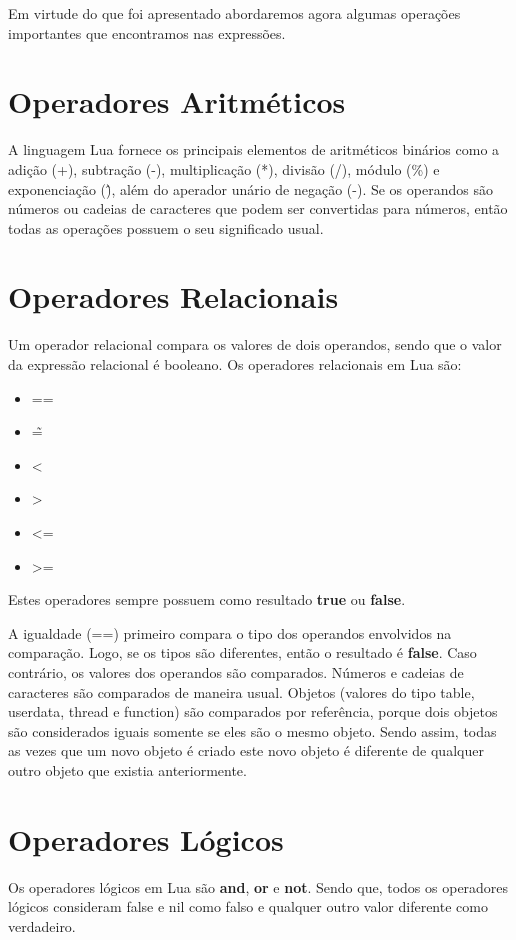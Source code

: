 \documentclass[
12pt, %
openright, %
oneside, %
a4paper, %
english, %
brazil, %
]{abntex2}
\begin{document}
Em virtude do que foi apresentado abordaremos agora algumas operações importantes que encontramos nas expressões.

\section{Operadores Aritméticos}
A linguagem Lua fornece os principais elementos de aritméticos binários como a adição (+), subtração (-), multiplicação (*), divisão (/), módulo (\%) e exponenciação (\^ ), além do aperador unário de negação (-). Se os operandos são números ou cadeias de caracteres que podem ser convertidas para números, então todas as operações possuem o seu significado usual.

\section{Operadores Relacionais}
Um operador relacional compara os valores de dois operandos, sendo que o valor da expressão relacional é booleano. Os operadores relacionais em Lua são:

\begin{itemize}
  \item ==
  \item \~=
  \item <
  \item >
  \item <=
  \item >=
\end{itemize}

Estes operadores sempre possuem como resultado \textbf{true} ou \textbf{false}.

A igualdade (==) primeiro compara o tipo dos operandos envolvidos na comparação. Logo, se os tipos são diferentes, então o resultado é \textbf{false}. Caso contrário, os valores dos operandos são comparados. Números e cadeias de caracteres são comparados de maneira usual. Objetos (valores do tipo table, userdata, thread e function) são comparados por referência, porque dois objetos são considerados iguais somente se eles são o mesmo objeto. Sendo assim, todas as vezes que um novo objeto é criado este novo objeto é diferente de qualquer outro objeto que existia anteriormente.

\section{Operadores Lógicos}
Os operadores lógicos em Lua são \textbf{and}, \textbf{or} e \textbf{not}. Sendo que, todos os operadores lógicos consideram false e nil como falso e qualquer outro valor diferente como verdadeiro.
\end{document}
